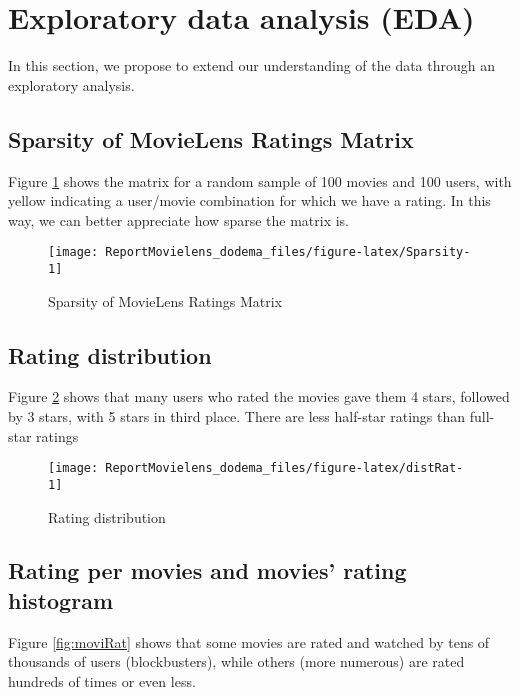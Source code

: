 \documentclass[
]{article}
\begin{document}
\section{Exploratory data analysis (EDA)}\label{exploratory-data-analysis-eda}

In this section, we propose to extend our understanding of the data through an exploratory analysis.

\subsection{Sparsity of MovieLens Ratings Matrix}\label{sparsity-of-movielens-ratings-matrix}

Figure \ref{fig:Sparsity} shows the matrix for a random sample of 100 movies and 100 users, with yellow indicating a user/movie combination for which we have a rating. In this way, we can better appreciate how sparse the matrix is.

\begin{figure}[H]
\texttt{[image: ReportMovielens\_dodema\_files/figure-latex/Sparsity-1]} \caption{Sparsity of MovieLens Ratings Matrix}\label{fig:Sparsity}
\end{figure}

\subsection{Rating distribution}\label{rating-distribution}

Figure \ref{fig:distRat} shows that many users who rated the movies gave them 4 stars, followed by 3 stars, with 5 stars in third place. There are less half-star ratings than full-star ratings

\begin{figure}[H]

{\centering \texttt{[image: ReportMovielens\_dodema\_files/figure-latex/distRat-1]} 

}

\caption{Rating distribution}\label{fig:distRat}
\end{figure}

\subsection{Rating per movies and movies' rating histogram}\label{rating-per-movies-and-movies-rating-histogram}

Figure \ref{fig:moviRat} shows that some movies are rated and watched by tens of thousands of users (blockbusters), while others (more numerous) are rated hundreds of times or even less.
\end{document}
